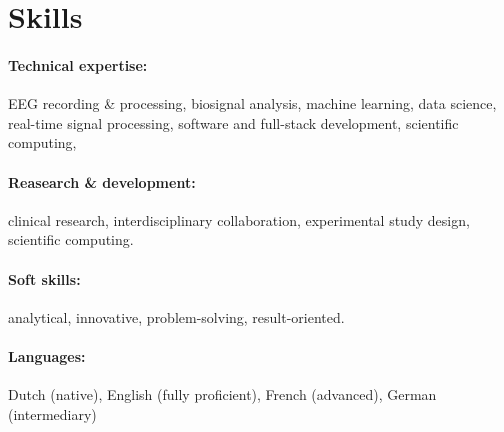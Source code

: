 \documentclass{resume}
\begin{document}

\section{Skills}
\paragraph{Technical expertise:} EEG recording \& processing, biosignal
analysis, machine learning, data science, real-time signal processing, software
and full-stack development, scientific computing,

\paragraph{Reasearch \& development:} clinical research, interdisciplinary
collaboration, experimental study design, scientific computing.

\paragraph{Soft skills:} analytical, innovative, problem-solving,
result-oriented.

\paragraph{Languages:} Dutch (native), English (fully proficient), French
(advanced), German (intermediary)
\end{document}
